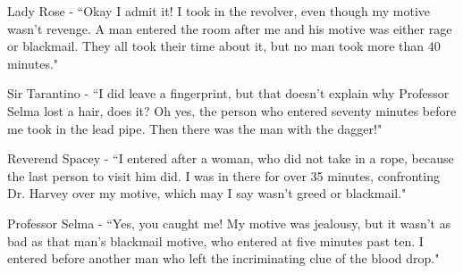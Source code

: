 \documentclass[addpoints]{exam}
\begin{document}
\begin{questions}
Lady Rose - ``Okay I admit it! I took in the revolver, even though my motive wasn't revenge. A man entered the room after me and his motive was either rage or blackmail. They all took their time about it, but no man took more than 40 minutes."

Sir Tarantino - ``I did leave a fingerprint, but that doesn't explain why Professor Selma lost a hair, does it? Oh yes, the person who entered seventy minutes before me took in the lead pipe. Then there was the man with the dagger!"

Reverend Spacey - ``I entered after a woman, who did not take in a rope, because the last person to visit him did. I was in there for over 35 minutes, confronting Dr. Harvey over my motive, which may I say wasn't greed or blackmail."

Professor Selma - ``Yes, you caught me! My motive was jealousy, but it wasn't as bad as that man's blackmail motive, who entered at five minutes past ten. I entered before another man who left the incriminating clue of the blood drop."


\end{questions}
\end{document}
